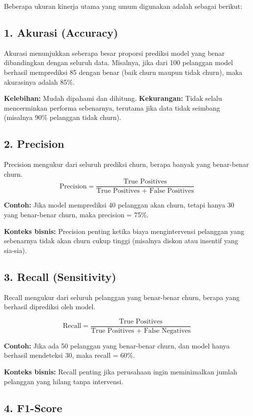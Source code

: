 Beberapa ukuran kinerja utama yang umum digunakan adalah sebagai berikut:

\subsection*{1. Akurasi (Accuracy)}

Akurasi menunjukkan seberapa besar proporsi prediksi model yang benar dibandingkan dengan seluruh data. Misalnya, jika dari 100 pelanggan model berhasil memprediksi 85 dengan benar (baik churn maupun tidak churn), maka akurasinya adalah 85\%.

\textbf{Kelebihan:} Mudah dipahami dan dihitung.  
\textbf{Kekurangan:} Tidak selalu mencerminkan performa sebenarnya, terutama jika data tidak seimbang (misalnya 90\% pelanggan tidak churn).

\subsection*{2. Precision}

Precision mengukur dari seluruh prediksi churn, berapa banyak yang benar-benar churn.  
\[
\text{Precision} = \frac{\text{True Positives}}{\text{True Positives + False Positives}}
\]

\textbf{Contoh:} Jika model memprediksi 40 pelanggan akan churn, tetapi hanya 30 yang benar-benar churn, maka precision = 75\%.

\textbf{Konteks bisnis:} Precision penting ketika biaya mengintervensi pelanggan yang sebenarnya tidak akan churn cukup tinggi (misalnya diskon atau insentif yang sia-sia).

\subsection*{3. Recall (Sensitivity)}

Recall mengukur dari seluruh pelanggan yang benar-benar churn, berapa yang berhasil diprediksi oleh model.

\[
\text{Recall} = \frac{\text{True Positives}}{\text{True Positives + False Negatives}}
\]

\textbf{Contoh:} Jika ada 50 pelanggan yang benar-benar churn, dan model hanya berhasil mendeteksi 30, maka recall = 60\%.

\textbf{Konteks bisnis:} Recall penting jika perusahaan ingin meminimalkan jumlah pelanggan yang hilang tanpa intervensi.

\subsection*{4. F1-Score}

